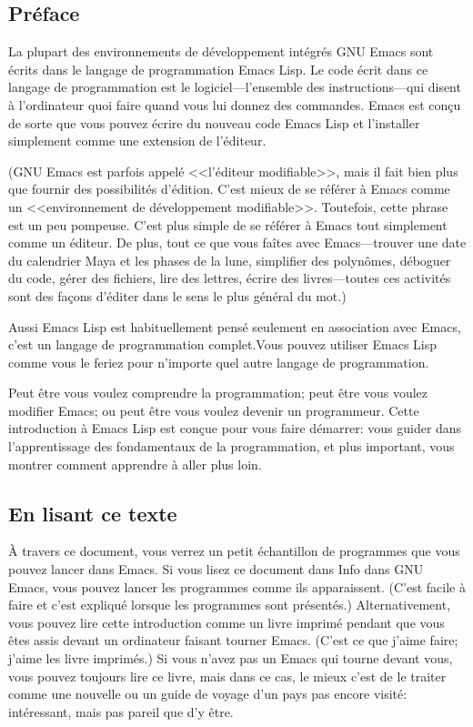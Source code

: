 \newcommand{\gnue}{GNU Emacs\xspace}
\newcommand{\el}{Emacs Lisp\xspace}
\newcommand{\MIT}{Massachussetts Institute of Technology\xspace}
\newcommand{\cl}{Common Lisp\xspace}

\subsection*{Préface}

La plupart des environnements de développement intégrés \gnue  sont
écrits dans le langage de programmation \el . Le code écrit dans
ce langage de programmation est le logiciel---l'ensemble des
instructions---qui disent à l'ordinateur quoi faire quand vous lui
donnez des commandes. Emacs est conçu de sorte que vous pouvez écrire
du nouveau code \el  et l'installer simplement comme une
extension de l'éditeur.

(\gnue  est parfois appelé <<l'éditeur modifiable>>, mais il fait
bien plus que fournir des possibilités d'édition. C'est mieux de se
référer à Emacs comme un <<environnement de développement
modifiable>>. Toutefois, cette phrase est un peu pompeuse. C'est plus
simple de se référer à Emacs tout simplement comme un éditeur. De
plus, tout ce que vous faîtes avec Emacs---trouver une date du
calendrier Maya et les phases de la lune, simplifier des polynômes,
déboguer du code, gérer des fichiers, lire des lettres, écrire des
livres---toutes ces activités sont des façons d'éditer dans le sens le
plus général du mot.)

Aussi \el  est habituellement pensé seulement en association
avec Emacs, c'est un langage de programmation complet.Vous pouvez
utiliser \el  comme vous le feriez pour n'importe quel autre
langage de programmation.

Peut être vous voulez comprendre la programmation; peut être vous
voulez modifier Emacs; ou peut être vous voulez devenir un
programmeur. Cette introduction à \el  est conçue pour vous
faire démarrer: vous guider dans l'apprentissage des fondamentaux de
la programmation, et plus important, vous montrer comment apprendre à
aller plus loin.

\subsection*{En lisant ce texte}

\`A travers ce document, vous verrez un petit échantillon de
programmes que vous pouvez lancer dans Emacs. Si vous lisez ce
document dans Info dans \gnue , vous pouvez lancer les programmes
comme ils apparaissent. (C'est facile à faire et c'est expliqué
lorsque les programmes sont présentés.) Alternativement, vous pouvez
lire cette introduction comme un livre imprimé pendant que vous êtes
assis devant un ordinateur faisant tourner Emacs. (C'est ce que j'aime
faire; j'aime les livre imprimés.) Si vous n'avez pas un Emacs qui
tourne devant vous, vous pouvez toujours lire ce livre, mais dans ce
cas, le mieux c'est de le traiter comme une nouvelle ou un guide de
voyage d'un pays pas encore visité: intéressant, mais pas pareil que
d'y être.

